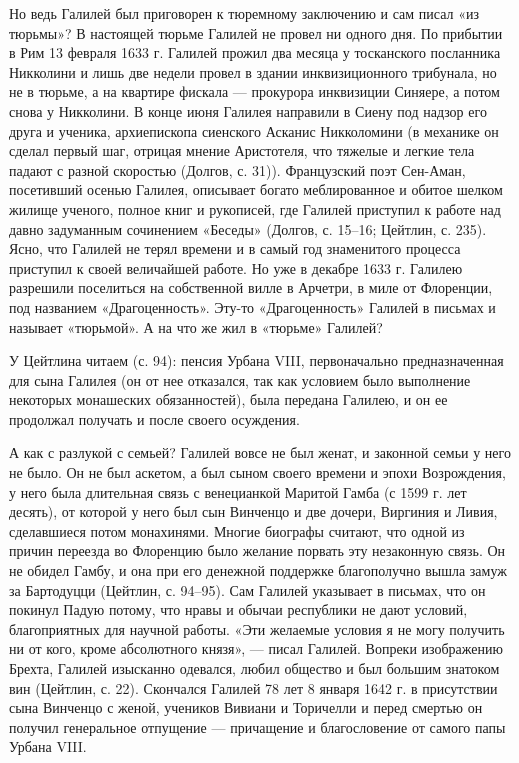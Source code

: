 Но ведь Галилей был приговорен к тюремному заключению и сам писал «из тюрьмы»?
В настоящей тюрьме Галилей не провел ни одного
дня. По прибытии в Рим 13 февраля 1633 г. Галилей прожил два месяца у
тосканского посланника Никколини и лишь две недели провел в здании
инквизиционного трибунала, но не в тюрьме, а на квартире фискала --- прокурора
инквизиции Синяере, а потом снова у Никколини. В конце июня Галилея направили в
Сиену под надзор его друга и ученика, архиепископа сиенского Асканис
Никколомини (в механике он сделал первый шаг, отрицая мнение Аристотеля, что
тяжелые и легкие тела падают с разной скоростью (Долгов, с. 31)). Французский
поэт Сен-Аман, посетивший осенью Галилея, описывает богато меблированное и
обитое шелком жилище ученого, полное книг и рукописей, где Галилей приступил к
работе над давно задуманным сочинением «Беседы» (Долгов, с. 15--16; Цейтлин, с.
235). Ясно, что Галилей не терял времени и в самый год знаменитого процесса
приступил к своей величайшей работе. Но уже в декабре 1633 г. Галилею разрешили
поселиться на собственной вилле в Арчетри, в миле от Флоренции, под названием
«Драгоценность». Эту-то «Драгоценность» Галилей в письмах и называет «тюрьмой».
А на что же жил в «тюрьме» Галилей?

У Цейтлина читаем (с. 94): пенсия Урбана VIII, первоначально предназначенная
для сына Галилея (он от нее отказался, так как условием было выполнение
некоторых монашеских обязанностей), была передана Галилею, и он ее продолжал
получать и после своего осуждения.

А как с разлукой с семьей? Галилей вовсе не был женат, и законной семьи у него
не было. Он не был аскетом, а был сыном своего времени и эпохи Возрождения, у
него была длительная связь с венецианкой Маритой Гамба (с 1599 г. лет десять),
от которой у него был сын Винченцо и две дочери, Виргиния и Ливия, сделавшиеся
потом монахинями. Многие биографы считают, что одной из причин переезда во
Флоренцию было желание порвать эту незаконную связь. Он не обидел Гамбу, и она
при его денежной поддержке благополучно вышла замуж за Бартодуцци (Цейтлин, с.
94--95). Сам Галилей указывает в письмах, что он покинул Падую потому, что нравы
и обычаи республики не дают условий, благоприятных для научной работы. «Эти
желаемые условия я не могу получить ни от кого, кроме абсолютного князя», ---
писал Галилей. Вопреки изображению Брехта, Галилей изысканно одевался, любил
общество и был большим знатоком вин (Цейтлин, с. 22). Скончался Галилей 78 лет
8 января 1642 г. в присутствии сына Винченцо с женой, учеников Вивиани и
Торичелли и перед смертью он получил генеральное отпущение --- причащение и
благословение от самого папы Урбана VIII.

